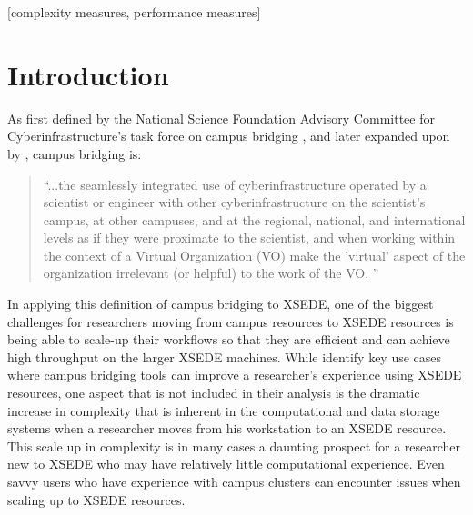 \documentclass{sig-alternate}
\begin{document}
[complexity measures, performance measures]



\section{Introduction}
As first defined by the National Science Foundation Advisory Committee for Cyberinfrastructure's task force on
campus bridging \cite{nsf2011}, and later expanded upon by \citeauthor{stewart2012}, campus bridging is:

\begin{quotation}
``...the seamlessly integrated use of cyberinfrastructure operated by a scientist or engineer
with other cyberinfrastructure on the scientist's campus, at other campuses, and at the regional, national,
and international levels as if they were proximate to the scientist, and when working within the context of a
Virtual Organization (VO) make the 'virtual' aspect of the organization irrelevant (or helpful) to the work of
the VO. \cite{stewart2012}''
\end{quotation}

In applying this definition of campus bridging to XSEDE, one of the biggest challenges for researchers moving
from campus resources to XSEDE resources is being able to scale-up their workflows so that they are efficient
and can achieve high throughput on the larger XSEDE machines. While \citeauthor{stewart2012} identify key use
cases where campus bridging tools can improve a researcher's experience using XSEDE resources, one aspect that
is not included in their analysis is the dramatic increase in complexity that is inherent in the computational
and data storage systems when a researcher moves from his workstation to an XSEDE resource. This scale up in
complexity is in many cases a daunting prospect for a researcher new to XSEDE who may have relatively little
computational experience. Even savvy users who have experience with campus clusters can encounter issues when
scaling up to XSEDE resources.
\end{document}
